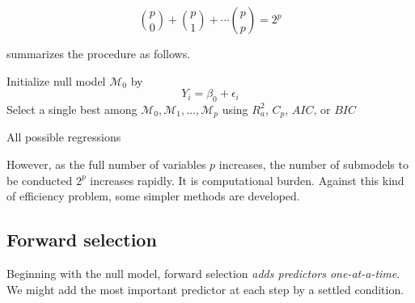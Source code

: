 \documentclass[]{book}
\theoremstyle{definition}
\theoremstyle{definition}
\theoremstyle{definition}
\theoremstyle{remark}
\begin{document}
\[\binom{p}{0} + \binom{p}{1} + \cdots \binom{p}{p} = 2^p\]

\citet{James:2013aa} summarizes the procedure as follows.

\begin{algorithm}[H] \label{alg:bestsubset}
  \SetAlgoLined
  Initialize null model $\mathcal{M}_0$ by $$Y_i = \beta_0 + \epsilon_i$$\;
  Select a single best among $\mathcal{M}_0, \mathcal{M}_1, \ldots, \mathcal{M}_p$ using $R_a^2$, $C_p$, $AIC$, or $BIC$\;
  \caption{All possible regressions}
\end{algorithm}

However, as the full number of variables \(p\) increases, the number of submodels to be conducted \(2^p\) increases rapidly. It is computational burden. Against this kind of efficiency problem, some simpler methods are developed.

\hypertarget{forward-selection}{%
\subsection{Forward selection}\label{forward-selection}}

Beginning with the null model, forward selection \emph{adds predictors one-at-a-time}. We might add the most important predictor at each step by a settled condition.
\end{document}
